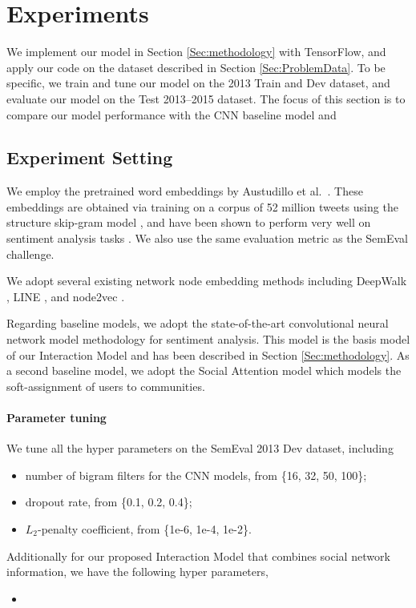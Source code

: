 

\section{Experiments}
We implement our model in Section \ref{Sec:methodology} with TensorFlow, 
and apply our code on the dataset described in Section \ref{Sec:ProblemData}. 
To be specific, we train and tune our model on the 2013 Train and Dev dataset, 
and evaluate our model on the Test 2013--2015 dataset. The focus of this section 
is to compare our model performance with the CNN baseline model and 

\subsection{Experiment Setting}
We employ the pretrained word embeddings by Austudillo et al.\ \cite{astudillo2015learning}. 
These embeddings are obtained via training on a corpus of 52 million tweets
using the structure skip-gram model \cite{ling2015two}, and have been shown to
perform very well on sentiment analysis tasks \cite{yang2017attention}.
We also use the same evaluation metric as the SemEval challenge.

We adopt several existing network node embedding methods including DeepWalk \cite{perozzi2014deepwalk},
LINE \cite{tang2015line}, and node2vec \cite{grover2016node2vec}. 


Regarding baseline models, we adopt the state-of-the-art convolutional neural network model
methodology for sentiment analysis. This model is the basis model of our Interaction Model and
has been described in Section \ref{Sec:methodology}. As a second baseline model, we adopt
the Social Attention model \cite{yang2017attention} which models the soft-assignment of
users to communities. 


\paragraph{Parameter tuning} We tune all the hyper parameters on the SemEval 2013 Dev dataset, including
\begin{itemize}
\item number of bigram filters for the CNN models, from \{16, 32, 50, 100\};
\item dropout rate, from \{0.1, 0.2, 0.4\};
\item $L_2$-penalty coefficient, from \{1e-6, 1e-4, 1e-2\}.
\end{itemize}
Additionally for our proposed Interaction Model that combines social network information, we have the following hyper parameters,
\begin{itemize}
\item 
\end{itemize}




